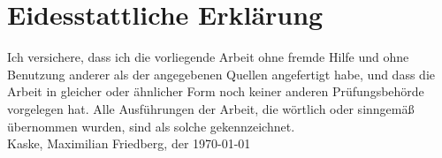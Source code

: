 \thispagestyle{empty}
\section*{Eidesstattliche Erklärung}
Ich versichere, dass ich die vorliegende Arbeit ohne fremde Hilfe und ohne Benutzung anderer als der angegebenen Quellen angefertigt habe, und dass die Arbeit in gleicher oder ähnlicher Form noch keiner anderen Prüfungsbehörde vorgelegen hat. Alle Ausführungen der Arbeit, die wörtlich oder sinngemäß übernommen wurden, sind als solche gekennzeichnet.\\
\linebreak
\linebreak
\flushleft
Kaske, Maximilian
\flushleft
Friedberg, der \today